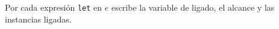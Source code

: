     \begin{exercise}
    Por cada expresión \texttt{let} en $e$ escribe la variable de ligado, el alcance y las instancias ligadas.
   





\end{exercise}
